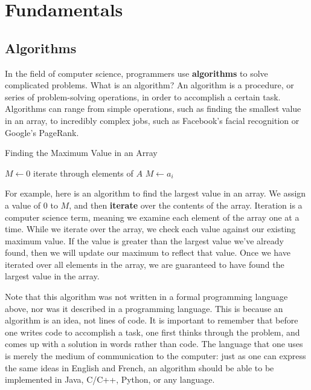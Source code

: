 \chapter{Fundamentals}

\section{Algorithms}

In the field of computer science, programmers use \textbf{algorithms} to solve complicated problems. What is an algorithm? An algorithm is a procedure, or series of problem-solving operations, in order to accomplish a certain task. Algorithms can range from simple operations, such as finding the smallest value in an array, to incredibly complex jobs, such as Facebook's facial recognition or Google's PageRank.

\begin{algorithm}[H]
\caption{Finding the Maximum Value in an Array}
\begin{algorithmic}
\State $M \gets 0$
 \Comment iterate through elements of $A$
        \State $M \gets a_i$
    \EndIf
\EndFor
\end{algorithmic}
\end{algorithm}

For example, here is an algorithm to find the largest value in an array.  We assign a value of $ 0 $ to $ M $, and then \textbf{iterate} over the contents of the array. Iteration is a computer science term, meaning we examine each element of the array one at a time. While we iterate over the array, we check each value against our existing maximum value.  If the value is greater than the largest value we've already found, then we will update our maximum to reflect that value.  Once we have iterated over all elements in the array, we are guaranteed to have found the largest value in the array.

Note that this algorithm was not written in a formal programming language above, nor was it described in a programming language.  This is because an algorithm is an idea, not lines of code.  It is important to remember that before one writes code to accomplish a task, one first thinks through the problem, and comes up with a solution in words rather than code.  The language that one uses is merely the medium of communication to the computer: just as one can express the same ideas in English and French, an algorithm should be able to be implemented in Java, C/C++, Python, or any language.

